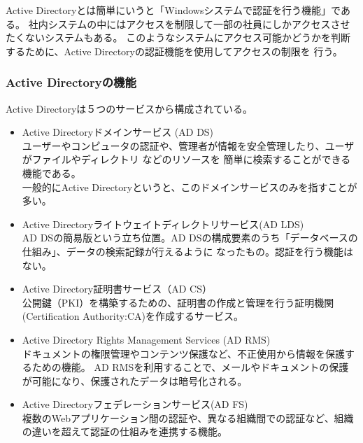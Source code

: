 \documentclass[12pt,a4paper,titlepage]{jreport}
\begin{document}
Active Directoryとは簡単にいうと「Windowsシステムで認証を行う機能」である。
社内システムの中にはアクセスを制限して一部の社員にしかアクセスさせたくないシステムもある。
このようなシステムにアクセス可能かどうかを判断するために、Active Directoryの認証機能を使用してアクセスの制限を
行う。

\subsubsection*{Active Directoryの機能}

Active Directoryは５つのサービスから構成されている。

\begin{itemize}
    \item  Active Directoryドメインサービス (AD DS)\mbox{}\\
    ユーザーやコンピュータの認証や、管理者が情報を安全管理したり、ユーザがファイルやディレクトリ などのリソースを
    簡単に検索することができる機能である。\\
    一般的にActive Directoryというと、このドメインサービスのみを指すことが多い。
    
    \item Active Directoryライトウェイトディレクトリサービス(AD LDS)\mbox{}\\
    AD DSの簡易版という立ち位置。AD DSの構成要素のうち「データベースの仕組み」、データの検索記録が行えるように
    なったもの。認証を行う機能はない。

    \item Active Directory証明書サービス（AD CS）\mbox{}\\
    公開鍵（PKI）を構築するための、証明書の作成と管理を行う証明機関(Certification Authority:CA)を作成するサービス。
    
    \item Active Directory Rights Management Services (AD RMS)\mbox{}\\
    ドキュメントの権限管理やコンテンツ保護など、不正使用から情報を保護するための機能。
    AD RMSを利用することで、メールやドキュメントの保護が可能になり、保護されたデータは暗号化される。

    \item Active Directoryフェデレーションサービス(AD FS)\mbox{}\\
    複数のWebアプリケーション間の認証や、異なる組織間での認証など、組織の違いを超えて認証の仕組みを連携する機能。


\end{itemize}
\end{document}
